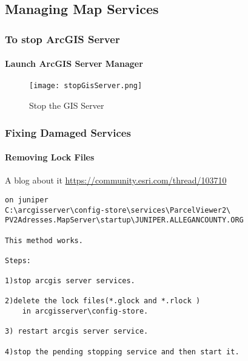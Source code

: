 \documentclass[class=book , crop=false, titlepage, twoside, multi={itemize, figure, verbatim}, float=false]{standalone}
\title{}  %
\begin{document}

\ifstandalone
\maketitle %
\tableofcontents %
\clearpage
\fi

\subsection{Managing Map Services}
\medskip
\subsubsection[Stopping the Server]{To stop ArcGIS Server}

\paragraph*{Launch ArcGIS Server Manager}
\begin{figure}[h!]
\centering
    \texttt{[image: stopGisServer.png]}
\caption{Stop the GIS Server}
\end{figure}

\subsubsection[Fixing Damaged Services]{\Large Fixing Damaged Services}

\paragraph[Remove Lock Files]{Removing Lock Files \texorpdfstring{\\}{}}
A blog about it
\href{https://community.esri.com/thread/103710}{https://community.esri.com/thread/103710}

\begin{verbatim}
on juniper
C:\arcgisserver\config-store\services\ParcelViewer2\
PV2Adresses.MapServer\startup\JUNIPER.ALLEGANCOUNTY.ORG

This method works.

Steps:

1)stop arcgis server services.

2)delete the lock files(*.glock and *.rlock )
    in arcgisserver\config-store.

3) restart arcgis server service.

4)stop the pending stopping service and then start it.
\end{verbatim}
\end{document}
